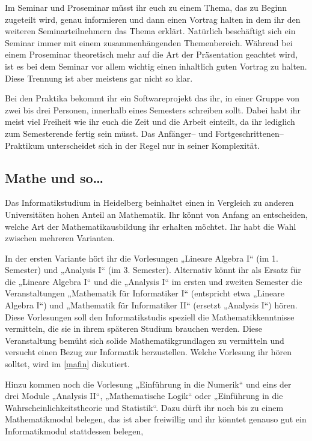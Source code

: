 Im Seminar und Proseminar müsst ihr euch zu einem Thema, das zu Beginn zugeteilt wird, genau informieren und dann einen Vortrag halten in dem ihr den weiteren Seminarteilnehmern das Thema erklärt. Natürlich beschäftigt sich ein Seminar immer mit einem zusammenhängenden Themenbereich. Während bei einem Proseminar theoretisch mehr auf die Art der Präsentation geachtet wird, ist es bei dem Seminar vor allem wichtig einen inhaltlich guten Vortrag zu halten. Diese Trennung ist aber meistens gar nicht so klar.

Bei den Praktika bekommt ihr ein Softwareprojekt das ihr, in einer Gruppe von zwei bis drei Personen, innerhalb eines Semesters schreiben sollt. Dabei habt ihr meist viel Freiheit wie ihr euch die Zeit und die Arbeit einteilt, da ihr lediglich zum Semesterende fertig sein müsst. Das Anfänger-- und Fortgeschrittenen--Praktikum unterscheidet sich in der Regel nur in seiner Komplexität.

\subsection{Mathe und so\dots}

Das Informatikstudium in Heidelberg beinhaltet einen in Vergleich zu anderen Universitäten hohen Anteil an Mathematik. Ihr könnt von Anfang an entscheiden, welche Art der Mathematikausbildung ihr erhalten möchtet. Ihr habt die Wahl zwischen mehreren Varianten.

In der ersten Variante hört ihr die Vorlesungen „Lineare Algebra I“ (im 1. Semester) und „Analysis I“ (im 3. Semester). Alternativ könnt ihr als Ersatz für die „Lineare Algebra I“ und die „Analysis I“ im ersten und zweiten Semester die Veranstaltungen „Mathematik für Informatiker I“ (entspricht etwa „Lineare Algebra I“) und „Mathematik für Informatiker II“ (ersetzt „Analysis I“) hören. Diese Vorlesungen soll den Informatikstudis speziell die Mathematikkenntnisse vermitteln, die sie in ihrem späteren Studium brauchen werden. Diese Veranstaltung bemüht sich solide Mathematikgrundlagen zu vermitteln und versucht einen Bezug zur Informatik herzustellen. Welche Vorlesung ihr hören solltet, wird im \autoref{mafin} diskutiert.

Hinzu kommen noch die Vorlesung „Einführung in die Numerik“ und eins der drei Module „Analysis II“, „Mathematische Logik“ oder „Einführung in die Wahrscheinlichkeitstheorie und Statistik“. Dazu dürft ihr noch bis zu einem Mathematikmodul belegen, das ist aber freiwillig und ihr könntet genauso gut ein Informatikmodul stattdessen belegen,

